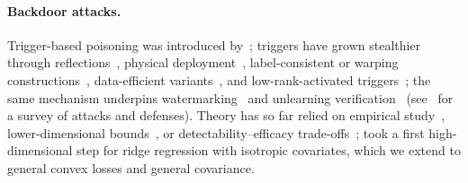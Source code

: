 \documentclass[11pt]{article}
\begin{document}
\paragraph{Backdoor attacks.}
Trigger-based poisoning was introduced by~\citet{gu_badnets_2019}; triggers have grown stealthier through reflections~\citep{liu_reflection_2020}, physical deployment~\citep{li_backdoor_2021}, label-consistent or warping constructions~\citep{turner_label-consistent_2019,nguyen_wanet_2021}, data-efficient variants~\citep{xia_data-efficient_2022,souly_poisoning_2025}, and low-rank-activated triggers~\citep{evansTheoryMinimalWeight2026}; the same mechanism underpins watermarking~\citep{adi_turning_2018} and unlearning verification~\citep{pawelczyk_machine_2025} (see~\citet{li_backdoor_2024} for a survey of attacks and defenses). Theory has so far relied on empirical study~\citep{gu_badnets_2019}, lower-dimensional bounds~\citep{lu_exploring_2023}, or detectability--efficacy trade-offs~\citep{granziolSafetyEfficacyTradeRobustness2026}; \citet{flynn_linear_2026} took a first high-dimensional step for ridge regression with isotropic covariates, which we extend to general convex losses and general covariance.
\end{document}
